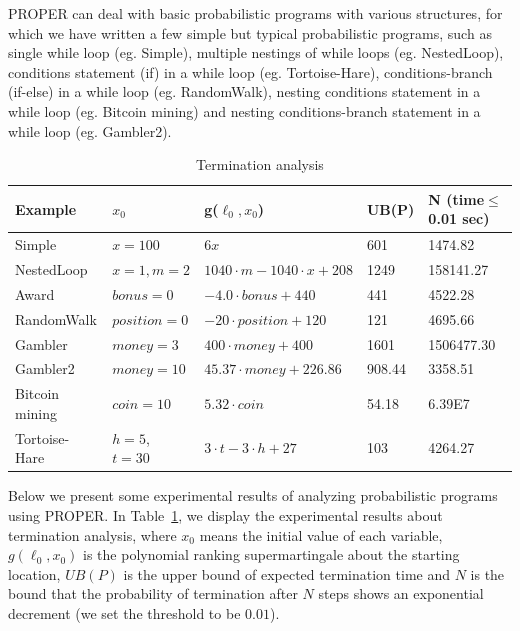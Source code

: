 \documentclass[runningheads]{llncs}
\begin{document}
PROPER can deal with basic probabilistic programs with various structures, for which we have written a few simple but typical probabilistic programs, such as single while loop (eg. Simple), multiple nestings of while loops (eg. NestedLoop), conditions statement (if) in a while loop (eg. Tortoise-Hare), conditions-branch (if-else) in a while loop (eg. RandomWalk), nesting conditions statement in a while loop (eg. Bitcoin mining) and nesting conditions-branch statement in a while loop (eg. Gambler2).



\begin{table}[htb]
	\centering
	\caption{Termination analysis}  
	\label{TerminationResult} 
	\begin{center}  
		\begin{tabular}{|l|l|l|l|l|}  
			\hline  	
			Example & $x_0$ & g($\ell_0,x_0$) & UB(P) & N (time$\leq$0.01 sec)\\ \hline  	
			Simple & $x=100$  & $6x$ & 601 & 1474.82 \\ \hline  		
			NestedLoop & $x=1, m=2$ & $1040\cdot m-1040\cdot x+208$ & 1249 & 158141.27 \\  \hline  
			Award & $bonus=0$ & $-4.0\cdot bonus+440$ & 441 &4522.28 \\  \hline  
			RandomWalk & $position=0$ & $-20\cdot position+120$ & 121 & 4695.66 \\  \hline  
			Gambler& $money=3$ & $400\cdot money+400$ & 1601 & 1506477.30 \\ \hline  		 
			Gambler2 & $money=10$ & $45.37 \cdot money+226.86$ & 908.44 & 3358.51 \\  \hline  
			Bitcoin mining & $coin=10$ & $5.32 \cdot coin$ & 54.18 & 6.39E7 \\  \hline 
			Tortoise-Hare & $h=5$, $t=30$ & $3\cdot t-3 \cdot h+27$ & 103 & 4264.27 \\  \hline  
		\end{tabular}  
	\end{center}  
\end{table}

Below we present some experimental results of analyzing probabilistic programs using PROPER. In Table~\ref{TerminationResult}, we display the experimental results about termination analysis, where $x_0$ means the initial value of each variable, $g(\ell_0,x_0)$ is the polynomial ranking supermartingale about the starting location, $UB(P)$ is the upper bound of expected termination time and $N$ is the bound that the probability of termination after $N$ steps shows an exponential decrement (we set the threshold to  be $0.01$).
\end{document}

